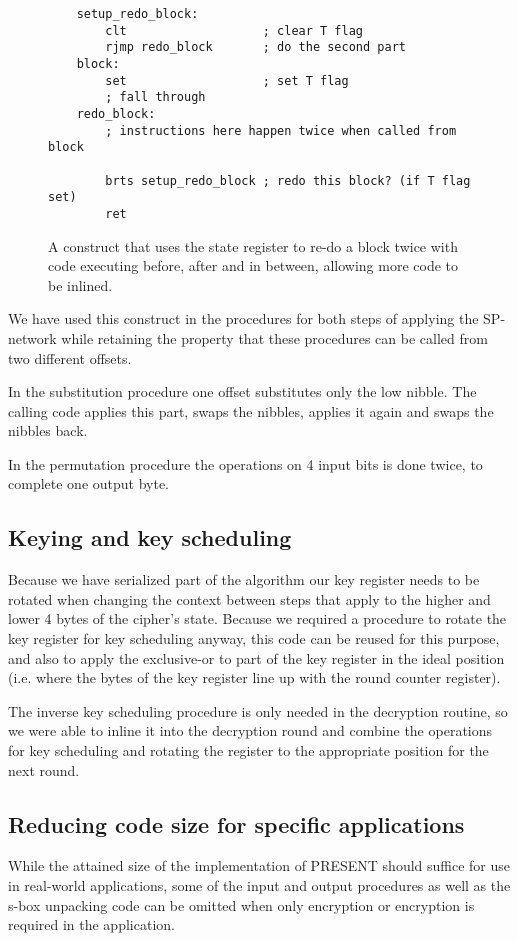 \documentclass{llncs}
\begin{document}
\begin{figure}
	\begin{lstlisting}
	setup_redo_block:
		clt                   ; clear T flag
		rjmp redo_block       ; do the second part
	block:
		set                   ; set T flag
		; fall through
	redo_block:
		; instructions here happen twice when called from block

		brts setup_redo_block ; redo this block? (if T flag set)
		ret
	\end{lstlisting}
	\caption{A construct that uses the state register to re-do a block twice with code executing before, after and in between, allowing more code to be inlined.}
\label{sreg_redo}
\end{figure}

We have used this construct in the procedures for both steps of applying the SP-network while retaining the property that these procedures can be called from two different offsets.

In the substitution procedure one offset substitutes only the low nibble.
The calling code applies this part, swaps the nibbles, applies it again and swaps the nibbles back.

In the permutation procedure the operations on 4 input bits is done twice, to complete one output byte.

\subsection{Keying and key scheduling}
Because we have serialized part of the algorithm our key register needs to be rotated when changing the context between steps that apply to the higher and lower 4 bytes of the cipher's state.
Because we required a procedure to rotate the key register for key scheduling anyway, this code can be reused for this purpose, and also to apply the exclusive-or to part of the key register in the ideal position (i.e. where the bytes of the key register line up with the round counter register).

The inverse key scheduling procedure is only needed in the decryption routine, so we were able to inline it into the decryption round and combine the operations for key scheduling and rotating the register to the appropriate position for the next round.

\subsection{Reducing code size for specific applications}
While the attained size of the implementation of PRESENT should suffice for use in real-world applications, some of the input and output procedures as well as the s-box unpacking code can be omitted when only encryption or encryption is required in the application.
\end{document}
